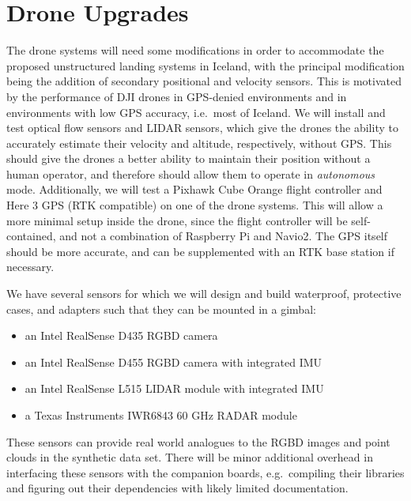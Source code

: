 \section{Drone Upgrades}
\label{section:drone_upgrades}

The drone systems will need some modifications in order to accommodate the proposed unstructured landing systems in Iceland,
with the principal modification being the addition of secondary positional and velocity sensors.
This is motivated by the performance of DJI drones in GPS-denied environments and in environments with low GPS accuracy, i.e.~most of Iceland.
We will install and test optical flow sensors and LIDAR sensors, which give the drones the ability to
accurately estimate their velocity and altitude, respectively, without GPS.
This should give the drones a better ability to maintain their position without a human operator,
and therefore should allow them to operate in \textit{autonomous} mode.
Additionally, we will test a Pixhawk Cube Orange flight controller and Here 3 GPS (RTK compatible)
on one of the drone systems.
This will allow a more minimal setup inside the drone, since the flight controller will be self-contained,
and not a combination of Raspberry Pi and Navio2.
The GPS itself should be more accurate, and can be supplemented with an RTK base station if necessary.

We have several sensors for which we will design and build waterproof, protective cases,
and adapters such that they can be mounted in a gimbal:
\begin{itemize}[itemsep=-0.1cm]
    \item an Intel RealSense D435 RGBD camera
    \item an Intel RealSense D455 RGBD camera with integrated IMU
    \item an Intel RealSense L515 LIDAR module with integrated IMU
    \item a Texas Instruments IWR6843 60 GHz RADAR module
\end{itemize}
These sensors can provide real world analogues to the RGBD images and point clouds in the synthetic data set.
There will be minor additional overhead in interfacing these sensors with the companion boards,
e.g.~compiling their libraries and figuring out their dependencies with likely limited documentation.